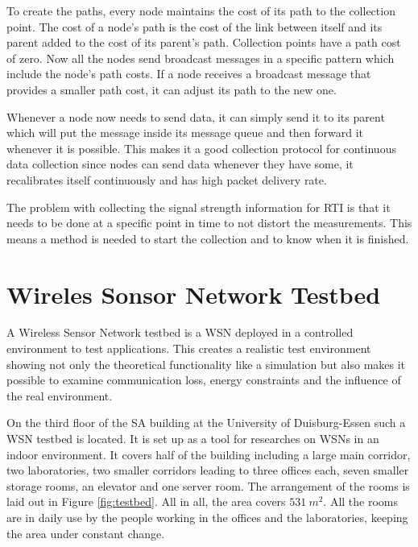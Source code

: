 To create the paths, every node maintains the cost of its path to the collection point. The cost of a node's path is the cost of the link between itself and its parent added to the cost of its parent's path. Collection points have a path cost of zero. Now all the nodes send broadcast messages in a specific pattern which include the node's path costs. If a node receives a broadcast message that provides a smaller path cost, it can adjust its path to the new one.

Whenever a node now needs to send data, it can simply send it to its parent which will put the message inside its message queue and then forward it whenever it is possible. This makes it a good collection protocol for continuous data collection since nodes can send data whenever they have some, it recalibrates itself continuously and has high packet delivery rate. \cite{CTP}

The problem with collecting the signal strength information for RTI is that it needs to be done at a specific point in time to not distort the measurements. This means a method is needed to start the collection and to know when it is finished. 
\section{Wireles Sonsor Network Testbed}
\label{chp:mat_testbed}
A Wireless Sensor Network testbed is a WSN deployed in a controlled environment to test applications. This creates a realistic test environment showing not only the theoretical functionality like a simulation but also makes it possible to examine communication loss, energy constraints and the influence of the real environment.  

On the third floor of the SA building at the University of Duisburg-Essen such a WSN testbed is located. It is set up as a tool for researches on WSNs in an indoor environment. It covers half of the building including a large main corridor, two laboratories, two smaller corridors leading to three offices each, seven smaller storage rooms, an elevator and one server room. The arrangement of the rooms is laid out in Figure \ref{fig:testbed}. All in all, the area covers $531\ m^2$. All the rooms are in daily use by the people working in the offices and the laboratories, keeping the area under constant change.

